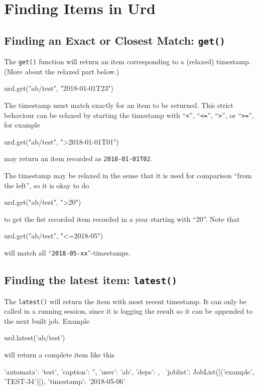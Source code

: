 \section{Finding Items in Urd}

\subsection{Finding an Exact or Closest Match:  \texttt{get()}}
The \texttt{get()} function will return an item corresponding to a
(relaxed) timestamp.  (More about the relaxed part below.)
\begin{python}
urd.get("ab/test", "2018-01-01T23")
\end{python}
The timestamp must match exactly for an item to be returned.  This
strict behaviour can be relaxed by starting the timestamp with
``\texttt{<}'', ``\texttt{<=}'', ``\texttt{>}'', or ``\texttt{>=}'',
for example
\begin{python}
urd.get("ab/test", ">2018-01-01T01")
\end{python}
may return an item recorded as \texttt{2018-01-01T02}.

The timestamp may be relaxed in the sense that it is used for
comparison ``from the left'', so it is okay to do
\begin{python}
urd.get("ab/test", ">20")
\end{python}
to get the fist recorded item recorded in a year starting with ``20''.
Note that
\begin{python}
urd.get("ab/test", "<=2018-05")
\end{python}
will match all ``\texttt{2018-05-xx}''-timestamps.


\subsection{Finding the latest item:  \texttt{latest()}}
The \texttt{latest()} will return the item with most recent timestamp.
It can only be called in a running session, since it is logging the
result so it can be appended to the next built job.  Example
\begin{python}
urd.latest('ab/test')
\end{python}
will return a complete item like this
\begin{shell}
{'automata': 'test', 'caption': '', 'user': 'ab', 'deps': {}, \
 'joblist': JobList([('example', 'TEST-34')]), 'timestamp': '2018-05-06'}
\end{shell}


